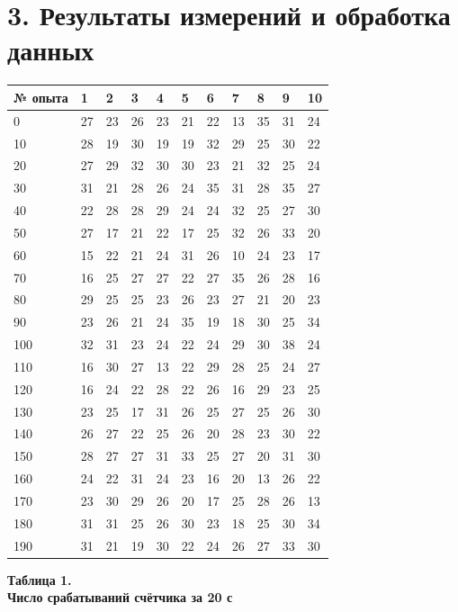 \section*{3. Результаты измерений и обработка данных}


\begin{table}[H]
    \centering
    \begin{tabular}{|l|l|l|l|l|l|l|l|l|l|l|}
        \hline
        № опыта & 1  & 2  & 3  & 4  & 5  & 6  & 7  & 8  & 9  & 10 \\ \hline
        0       & 27 & 23 & 26 & 23 & 21 & 22 & 13 & 35 & 31 & 24 \\ \hline
        10      & 28 & 19 & 30 & 19 & 19 & 32 & 29 & 25 & 30 & 22 \\ \hline
        20      & 27 & 29 & 32 & 30 & 30 & 23 & 21 & 32 & 25 & 24 \\ \hline
        30      & 31 & 21 & 28 & 26 & 24 & 35 & 31 & 28 & 35 & 27 \\ \hline
        40      & 22 & 28 & 28 & 29 & 24 & 24 & 32 & 25 & 27 & 30 \\ \hline
        50      & 27 & 17 & 21 & 22 & 17 & 25 & 32 & 26 & 33 & 20 \\ \hline
        60      & 15 & 22 & 21 & 24 & 31 & 26 & 10 & 24 & 23 & 17 \\ \hline
        70      & 16 & 25 & 27 & 27 & 22 & 27 & 35 & 26 & 28 & 16 \\ \hline
        80      & 29 & 25 & 25 & 23 & 26 & 23 & 27 & 21 & 20 & 23 \\ \hline
        90      & 23 & 26 & 21 & 24 & 35 & 19 & 18 & 30 & 25 & 34 \\ \hline
        100     & 32 & 31 & 23 & 24 & 22 & 24 & 29 & 30 & 38 & 24 \\ \hline
        110     & 16 & 30 & 27 & 13 & 22 & 29 & 28 & 25 & 24 & 27 \\ \hline
        120     & 16 & 24 & 22 & 28 & 22 & 26 & 16 & 29 & 23 & 25 \\ \hline
        130     & 23 & 25 & 17 & 31 & 26 & 25 & 27 & 25 & 26 & 30 \\ \hline
        140     & 26 & 27 & 22 & 25 & 26 & 20 & 28 & 23 & 30 & 22 \\ \hline
        150     & 28 & 27 & 27 & 31 & 33 & 25 & 27 & 20 & 31 & 30 \\ \hline
        160     & 24 & 22 & 31 & 24 & 23 & 16 & 20 & 13 & 26 & 22 \\ \hline
        170     & 23 & 30 & 29 & 26 & 20 & 17 & 25 & 28 & 26 & 13 \\ \hline
        180     & 31 & 31 & 25 & 26 & 30 & 23 & 18 & 25 & 30 & 34 \\ \hline
        190     & 31 & 21 & 19 & 30 & 22 & 24 & 26 & 27 & 33 & 30 \\ \hline
    \end{tabular}
    \begin{flushright}
        {\scriptsize \textbf{Таблица 1.}\\ \textbf {Число срабатываний счётчика за 20 с}}
    \end{flushright}
\end{table}

